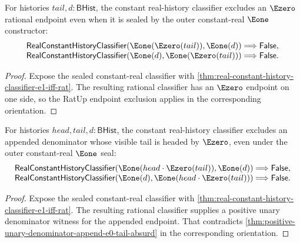 \begin{theorem}
\label{thm:real-constant-history-classifier-e1-e0-endpoint-absurd}
For histories $tail,d:\mathsf{BHist}$, the constant real-history classifier
excludes an $\Ezero$ rational endpoint even when it is sealed by the outer
constant-real $\Eone$ constructor:
$$
\begin{array}{l}
\mathsf{RealConstantHistoryClassifier}(\Eone(\Ezero(tail)),\Eone(d))
\Longrightarrow\mathsf{False},\\
\mathsf{RealConstantHistoryClassifier}(\Eone(d),\Eone(\Ezero(tail)))
\Longrightarrow\mathsf{False}.
\end{array}
$$
\end{theorem}
\begin{proof}
Expose the sealed constant-real classifier with
\autoref{thm:real-constant-history-classifier-e1-iff-rat}. The resulting
rational classifier has an $\Ezero$ endpoint on one side, so the RatUp endpoint
exclusion applies in the corresponding orientation.
\end{proof}

\begin{theorem}
\label{thm:real-constant-history-classifier-e1-append-e0-endpoint-absurd}
For histories $head,tail,d:\mathsf{BHist}$, the constant real-history
classifier excludes an appended denominator whose visible tail is headed by
$\Ezero$, even under the outer constant-real $\Eone$ seal:
$$
\begin{array}{l}
\mathsf{RealConstantHistoryClassifier}(\Eone(head\cdot\Ezero(tail)),\Eone(d))
\Longrightarrow\mathsf{False},\\
\mathsf{RealConstantHistoryClassifier}(\Eone(d),\Eone(head\cdot\Ezero(tail)))
\Longrightarrow\mathsf{False}.
\end{array}
$$
\end{theorem}
\begin{proof}
Expose the sealed constant-real classifier with
\autoref{thm:real-constant-history-classifier-e1-iff-rat}. The resulting
rational classifier supplies a positive unary denominator witness for the
appended endpoint. That contradicts
\autoref{thm:positive-unary-denominator-append-e0-tail-absurd} in the
corresponding orientation.
\end{proof}

